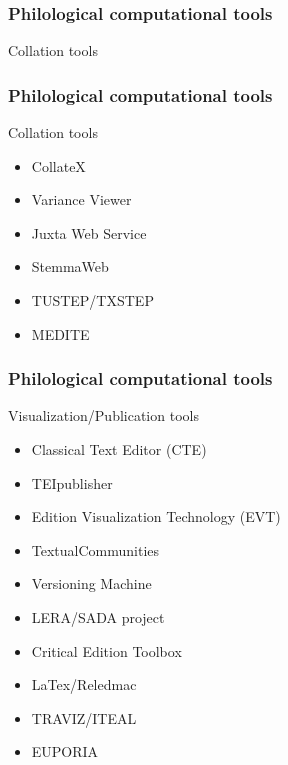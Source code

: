 \begin{frame}
	\frametitle{Philological computational tools}
	\addtocounter{nframe}{1}
    \begin{block}{Collation tools}
            
		\begin{block}
		\end{block}
	\end{block}
\end{frame}

\begin{frame}
	\frametitle{Philological computational tools}
	\addtocounter{nframe}{1}
    \begin{block}{Collation tools}
		\begin{itemize}
			\item CollateX
			\item Variance Viewer
			\item Juxta Web Service
			\item StemmaWeb
			\item TUSTEP/TXSTEP
			\item MEDITE
		\end{itemize}
	\end{block}
\end{frame}

\begin{frame}
	\frametitle{Philological computational tools}
	\addtocounter{nframe}{1}
    \begin{block}{Visualization/Publication tools}
		\begin{itemize}
			\item Classical Text Editor (CTE)
			\item TEIpublisher
			\item Edition Visualization Technology (EVT)
			\item TextualCommunities
			\item Versioning Machine
			\item LERA/SADA project
			\item Critical Edition Toolbox
			\item LaTex/Reledmac
			\item TRAVIZ/ITEAL
			\item EUPORIA
		\end{itemize}
	\end{block}
\end{frame}

